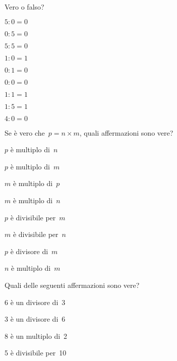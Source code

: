 \begin{esercizio}
\label{ese:1.3}
 Vero o falso?
\begin{multicols}{3}
\begin{enumeratea}
 \item $5:0=0$	\tab\boxV\quad\boxF
 \item $0:5=0$	\tab\boxV\quad\boxF
 \item $5:5=0$	\tab\boxV\quad\boxF
 \item $1:0=1$	\tab\boxV\quad\boxF
 \item $0:1=0$	\tab\boxV\quad\boxF
 \item $0:0=0$	\tab\boxV\quad\boxF
 \item $1:1=1$	\tab\boxV\quad\boxF
 \item $1:5=1$	\tab\boxV\quad\boxF
 \item $4:0=0$  \tab\boxV\quad\boxF
\end{enumeratea}
\end{multicols}
\end{esercizio}

\begin{esercizio}
\label{ese:1.4}
 Se è vero che~$p=n\times m$, quali affermazioni sono vere?
\begin{multicols}{2}
\TabPositions{3.2cm}
\begin{enumeratea}
 \item $p$ è multiplo di~$n$	\tab\boxV\quad\boxF
 \item $p$ è multiplo di~$m$	\tab\boxV\quad\boxF
 \item $m$ è multiplo di~$p$	\tab\boxV\quad\boxF
 \item $m$ è multiplo di~$n$	\tab\boxV\quad\boxF
 \item $p$ è divisibile per~$m$	\tab\boxV\quad\boxF
 \item $m$ è divisibile per~$n$	\tab\boxV\quad\boxF
 \item $p$ è divisore di~$m$	\tab\boxV\quad\boxF
 \item $n$ è multiplo di~$m$	\tab\boxV\quad\boxF
\end{enumeratea}
\end{multicols}
\end{esercizio}

\begin{esercizio}
\label{ese:1.5}
 Quali delle seguenti affermazioni sono vere?

\begin{multicols}{2}
\TabPositions{3.2cm}
 \begin{enumeratea}
 \item 6 è un divisore di~3 \tab\boxV\quad\boxF
 \item 3 è un divisore di~6 \tab\boxV\quad\boxF
 \item 8 è un multiplo di~2 \tab\boxV\quad\boxF
 \item 5 è divisibile per~10 \tab\boxV\quad\boxF
 \end{enumeratea}
\end{multicols}
\end{esercizio}

